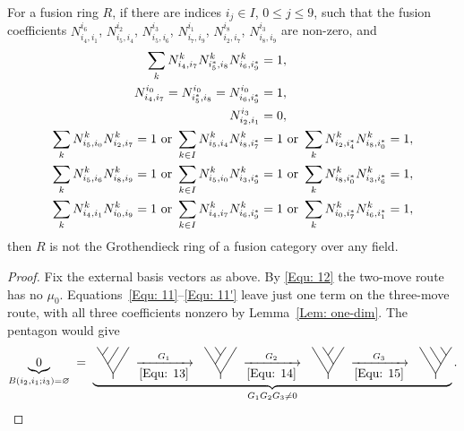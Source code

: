 \documentclass{amsart}
\begin{document}
\begin{theorem}\label{Thm: Ob-1}%
For a fusion ring $R$,
if there are indices $i_j \in I$, $0\leq j \leq 9$, such that the fusion coefficients
$N_{i_4,i_1}^{i_6}$, $N_{i_5,i_4}^{i_2}$, $N_{i_5,i_6}^{i_3}$, $N_{i_7,i_9}^{i_1}$, $N_{i_2,i_7}^{i_8}$, $N_{i_8,i_9}^{i_3}$ are non-zero, and
\begin{align}\label{Equ: 11}
\sum_{k} N_{i_4,i_7}^{k} N_{i_5^*,i_8}^{k} N_{i_6,i_9^*}^{k}&=1, \\ \label{Equ: 11'}
N_{i_4,i_7}^{\spec}=N_{i_5^*,i_8}^{\spec}=N_{i_6,i_9^*}^{\spec}&=1,
\\ \label{Equ: 12}
N_{i_2,i_1}^{i_{3}}&=0, \\ \label{Equ: 13}
\sum_{k} N_{i_5,\spec}^{k} N_{i_2,i_7}^{k} =1 %
~\text{or}~
\sum_{k \in I} N_{i_5,i_4}^{k} N_{i_8,i_7^*}^{k} &=1 %
~\text{or}~
\sum_{k} N_{i_2,i_4^*}^{k} N_{i_8,\spec^*}^{k} =1, %
\\ \label{Equ: 14}
\sum_{k} N_{i_5,i_6}^{k} N_{i_8,i_9}^{k} =1 %
~\text{or}~
\sum_{k \in I} N_{i_5,\spec}^{k} N_{i_3,i_9^*}^{k} &=1 %
~\text{or}~
\sum_{k} N_{i_8,\spec^*}^{k} N_{i_3,i_6^*}^{k} =1, %
\\ \label{Equ: 15}
\sum_{k} N_{i_4,i_1}^{k} N_{\spec,i_9}^{k} =1 %
~\text{or}~
\sum_{k \in I} N_{i_4,i_7}^{k} N_{i_6,i_9^*}^{k} &=1 %
~\text{or}~
\sum_{k} N_{\spec,i_7^*}^{k} N_{i_6,i_1^*}^{k} =1, %
\end{align}
then $R$ is not the Grothendieck ring of a fusion category over any field.
\end{theorem}

\begin{proof}
Fix the external basis vectors as above. By \eqref{Equ: 12} the two-move route has no $\mu_0$. Equations~\eqref{Equ: 11}--\eqref{Equ: 11'} leave just one term on the three-move route, with all three coefficients nonzero by Lemma~\ref{Lem: one-dim}. The pentagon would give
\[
 \underbrace{0}_{\mB(i_2,i_1;i_3)=\varnothing}\;=\;
 \underbrace{\spectrumtree{0}\;\xrightarrow[\eqref{Equ: 13}]{G_1}\;\spectrumtree{3}
 \;\xrightarrow[\eqref{Equ: 14}]{G_2}\;\spectrumtree{4}
 \;\xrightarrow[\eqref{Equ: 15}]{G_3}\;\spectrumtree{2}}_{G_1G_2G_3\ne0}.\qedhere
\]
\end{proof}
\end{document}
